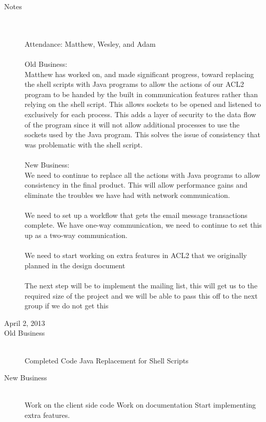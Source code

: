 \documentclass[11pt, letterpaper]{report}
\begin{document}
\begin{description}
\item[Notes] \hfill \\ \hfill \\
Attendance:  Matthew, Wesley, and Adam\\ \\
Old Business: \\
Matthew has worked on, and made significant progress, toward replacing the shell scripts with Java programs to allow the actions of our ACL2 program to be handed by the built in communication features rather than relying on the shell script. This allows sockets to be opened and listened to exclusively for each process. This adds a layer of security to the data flow of the program since it will not allow additional processes to use the sockets used by the Java program. This solves the issue of consistency that was problematic with the shell script. 
\\ \\
New Business:\\
We need to continue to replace all the actions with Java programs to allow consistency in the final product. This will allow performance gains and eliminate the troubles we have had with network communication. \\ \\
We need to set up a workflow that gets the email message transactions complete. We have one-way communication, we need to continue to set this up as a two-way communication.\\\\
We need to start working on extra features in ACL2 that we originally planned in the design document \\ \\
The next step will be to implement the mailing list, this will get us to the required size of the project and we will be able to pass this off to the next group if we do not get this 



\newpage
\item[\Large April 2, 2013]
\hypertarget{April 2, 2013} {}
\item[Old Business] \hfill \\
\subitem Completed Code
\subitem Java Replacement for Shell Scripts
\item[New Business] \hfill \\
\subitem Work on the client side code
\subitem Work on documentation
\subitem Start implementing extra features.


\end{description}
\end{document}
